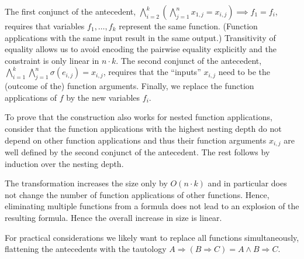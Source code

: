 \documentclass{svjour3}
\begin{document}
The first conjunct of the antecedent, $\bigwedge_{i=2}^k\left(\bigwedge_{j=1}^n x_{1,j} \!=\! x_{i,j}\right)\implies f_1 = f_{i}$, requires that variables $f_1,\dots, f_k$ represent the same function.
(Function applications with the same input result in the same output.)
Transitivity of equality allows us to avoid encoding the pairwise equality explicitly and the constraint is only linear in $n\cdot k$.
The second conjunct of the antecedent, $\bigwedge_{i=1}^k\bigwedge_{j=1}^n \sigma(e_{i,j}) \!=\! x_{i,j}$, requires that the ``inputs'' $x_{i,j}$ need to be the (outcome of the) function arguments.
Finally, we replace the function applications of $f$ by the new variables $f_i$.

To prove that the construction also works for nested function applications, consider that the function applications with the highest nesting depth do not depend on other function applications and thus their function arguments $x_{i,j}$ are well defined by the second conjunct of the antecedent.
The rest follows by induction over the nesting depth.

The transformation increases the size only by $O(n\cdot k)$ and in particular does not change the number of function applications of other functions.
Hence, eliminating multiple functions from a formula does not lead to an explosion of the resulting formula.
Hence the overall increase in size is linear.


For practical considerations we likely want to replace all functions simultaneously, flattening the antecedents with the tautology $A\Rightarrow (B\Rightarrow C)=A\wedge B\Rightarrow C$.

\end{document}
